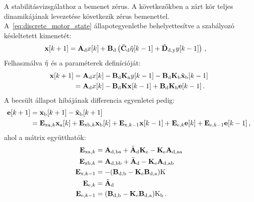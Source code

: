 A stabilitásvizsgálathoz a bemenet zérus. A következőkben a zárt kör teljes dinamikájának levezetése 
következik zérus bemenettel. A~\eqref{eq:discrete_motor_state} állapotegyenletbe behelyettesítve a 
szabályozó késleltetett kimenetét:
\begin{align}
    \begin{split}
    \mathbf{x}[k+1] &= \mathbf{A}_{\mathrm{d}} x[k] + 
    \mathbf{B}_{\mathrm{d}} \left(\tilde{\mathbf{C}}_{\mathrm{d}} \tilde{\mathbf{\eta}}[k-1] + 
    \tilde{\mathbf{D}}_{\mathrm{d,y}} y[k-1]\right)\,,
    \end{split}        
\end{align}
Felhasználva \(\tilde{\mathbf{\eta}}\) és a paraméterek definícióját:
\begin{align}\label{eq:discrete_motor_state_closed}
    \begin{split}
        \mathbf{x}[k+1] &= \mathbf{A}_{\mathrm{d}} x[k] - 
        \mathbf{B}_{\mathrm{d}} \mathbf{K}_{\mathrm{a}} y[k-1] - 
        \mathbf{B}_{\mathrm{d}} \mathbf{K}_{\mathrm{b}} \tilde{\mathbf{x}}_{\mathrm{b}}[k-1] \\
        &= \mathbf{A}_{\mathrm{d}} x[k] - 
        \mathbf{B}_{\mathrm{d}} \mathbf{K} \mathbf{x}[k-1] +
        \mathbf{B}_{\mathrm{d}} \mathbf{K}_{\mathrm{b}} \mathbf{e}[k-1]\,.
    \end{split}        
\end{align}
A becsült állapot hibájának differencia egyenletei pedig:
\begin{align}
    \begin{split}
        \mathbf{e}[k+1] &= \mathbf{x}_{\mathrm{b}}[k+1] - \tilde{\mathbf{x}}_{\mathrm{b}}[k+1] \\
        &= \mathbf{E}_{\mathrm{xa},k}\mathbf{x}_{\mathrm{a}}[k] + 
        \mathbf{E}_{\mathrm{xb},k}\mathbf{x}_{\mathrm{b}}[k] + 
        \mathbf{E}_{\mathrm{x},k-1}\mathbf{x}[k-1] + 
        \mathbf{E}_{\mathrm{e},k}\mathbf{e}[k] + 
        \mathbf{E}_{\mathrm{e},k-1}\mathbf{e}[k-1]
        \,,
    \end{split}        
\end{align}
ahol a mátrix együtthatók:
\begin{align}
    \begin{split}
        \mathbf{E}_{\mathrm{xa},k} &= \mathbf{A}_{\mathrm{d,ba}} + 
        \tilde{\mathbf{A}}_{\mathrm{d}} \mathbf{K}_{\mathrm{e}} -
        \mathbf{K}_{\mathrm{e}} \mathbf{A}_{\mathrm{d,aa}} \\
        \mathbf{E}_{\mathrm{xb},k} &= \mathbf{A}_{\mathrm{d,bb}} + 
        \tilde{\mathbf{A}}_{\mathrm{d}} -
        \mathbf{K}_{\mathrm{e}} \mathbf{A}_{\mathrm{d,ab}} \\
        \mathbf{E}_{\mathrm{x},k-1} &= -(\mathbf{B}_{\mathrm{d,b}} -
        \mathbf{K}_{\mathrm{e}} \mathbf{B}_{\mathrm{d,a}})\mathrm{K} \\
        \mathbf{E}_{\mathrm{e},k} &= \tilde{\mathbf{A}}_{\mathrm{d}} \\
        \mathbf{E}_{\mathrm{e},k-1} &= (\mathbf{B}_{\mathrm{d,b}} -
        \mathbf{K}_{\mathrm{e}} \mathbf{B}_{\mathrm{d,a}})\mathrm{K}_{\mathrm{b}}\,.
    \end{split}        
\end{align}
